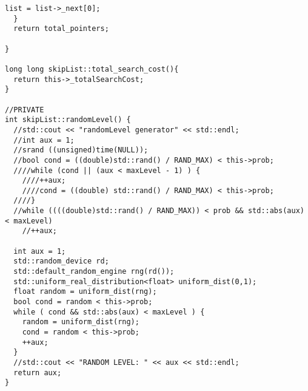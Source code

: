 \begin{lstlisting}[caption=Code from file skipList.cpp, style=myC]
    list = list->_next[0];
  }
  return total_pointers;

}

long long skipList::total_search_cost(){
  return this->_totalSearchCost;
}

//PRIVATE
int skipList::randomLevel() {
  //std::cout << "randomLevel generator" << std::endl;
  //int aux = 1;
  //srand ((unsigned)time(NULL));
  //bool cond = ((double)std::rand() / RAND_MAX) < this->prob;
  ////while (cond || (aux < maxLevel - 1) ) {
    ////++aux;
    ////cond = ((double) std::rand() / RAND_MAX) < this->prob;
  ////}
  //while ((((double)std::rand() / RAND_MAX)) < prob && std::abs(aux) < maxLevel)
    //++aux;

  int aux = 1;
  std::random_device rd;
  std::default_random_engine rng(rd());
  std::uniform_real_distribution<float> uniform_dist(0,1);
  float random = uniform_dist(rng);
  bool cond = random < this->prob;
  while ( cond && std::abs(aux) < maxLevel ) {
    random = uniform_dist(rng);
    cond = random < this->prob;
    ++aux;
  }
  //std::cout << "RANDOM LEVEL: " << aux << std::endl;
  return aux;
}


\end{lstlisting}


